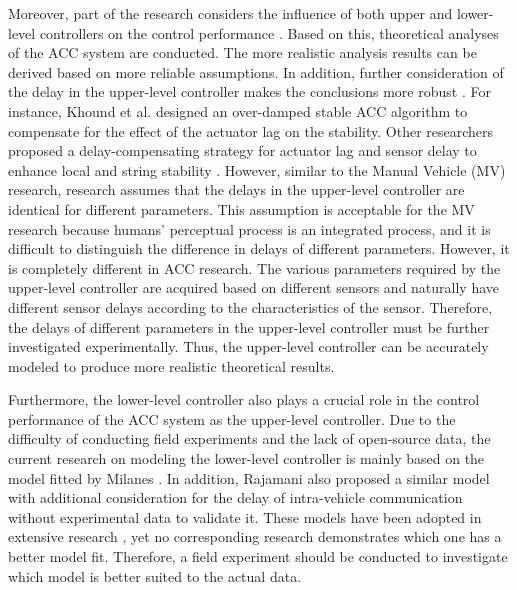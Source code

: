 \documentclass[journal]{IEEEtran}
\begin{document}
Moreover, part of the research considers the influence of both upper and lower-level controllers on the control performance \citep{Wang2018a,Zhou2019c}. Based on this, theoretical analyses of the ACC system are conducted. The more realistic analysis results can be derived based on more reliable assumptions. In addition, further consideration of the delay in the upper-level controller makes the conclusions more robust \citep{Jin2016}. For instance, Khound et al. \citep{Khound2022} designed an over-damped stable ACC algorithm to compensate for the effect of the actuator lag on the stability. Other researchers proposed a delay-compensating strategy for actuator lag and sensor delay to enhance local and string stability \citep{Wang2018f,Khound2021}. However, similar to the Manual Vehicle (MV) research, research assumes that the delays in the upper-level controller are identical for different parameters. This assumption is acceptable for the MV research because humans' perceptual process is an integrated process, and it is difficult to distinguish the difference in delays of different parameters. However, it is completely different in ACC research. The various parameters required by the upper-level controller are acquired based on different sensors and naturally have different sensor delays according to the characteristics of the sensor. Therefore, the delays of different parameters in the upper-level controller must be further investigated experimentally. Thus, the upper-level controller can be accurately modeled to produce more realistic theoretical results.



Furthermore, the lower-level controller also plays a crucial role in the control performance of the ACC system as the upper-level controller. Due to the difficulty of conducting field experiments and the lack of open-source data, the current research on modeling the lower-level controller is mainly based on the model fitted by Milanes \citep{Milanes2014}. In addition, Rajamani \citep{Rajamani2011} also proposed a similar model with additional consideration for the delay of intra-vehicle communication without experimental data to validate it. These models have been adopted in extensive research \citep{Wang2018a,Navas2019}, yet no corresponding research demonstrates which one has a better model fit. Therefore, a field experiment should be conducted to investigate which model is better suited to the actual data.
\end{document}
